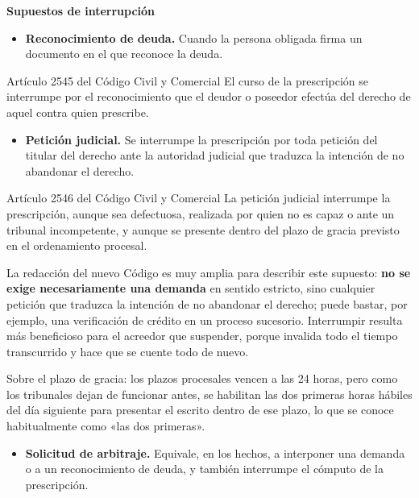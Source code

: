 \documentclass[12pt,oneside]{book}
\begin{document}
\textbf{Supuestos de interrupción}

\begin{itemize}
    \item \textbf{Reconocimiento de deuda.} Cuando la persona obligada firma un documento en el que reconoce la deuda.
\end{itemize}

\begin{articulo}{Artículo 2545 del Código Civil y Comercial}
El curso de la prescripción se interrumpe por el reconocimiento que el deudor o poseedor efectúa del derecho de aquel contra quien prescribe.
\end{articulo}

\begin{itemize}
    \item \textbf{Petición judicial.} Se interrumpe la prescripción por toda petición del titular del derecho ante la autoridad judicial que traduzca la intención de no abandonar el derecho.
\end{itemize}

\begin{articulo}{Artículo 2546 del Código Civil y Comercial}
La petición judicial interrumpe la prescripción, aunque sea defectuosa, realizada por quien no es capaz o ante un tribunal incompetente, y aunque se presente dentro del plazo de gracia previsto en el ordenamiento procesal.
\end{articulo}

La redacción del nuevo Código es muy amplia para describir este supuesto: \textbf{no se exige necesariamente una demanda} en sentido estricto, sino cualquier petición que traduzca la intención de no abandonar el derecho; puede bastar, por ejemplo, una verificación de crédito en un proceso sucesorio. Interrumpir resulta más beneficioso para el acreedor que suspender, porque invalida todo el tiempo transcurrido y hace que se cuente todo de nuevo.

Sobre el plazo de gracia: los plazos procesales vencen a las 24 horas, pero como los tribunales dejan de funcionar antes, se habilitan las dos primeras horas hábiles del día siguiente para presentar el escrito dentro de ese plazo, lo que se conoce habitualmente como «las dos primeras».

\begin{itemize}
    \item \textbf{Solicitud de arbitraje.} Equivale, en los hechos, a interponer una demanda o a un reconocimiento de deuda, y también interrumpe el cómputo de la prescripción.
\end{itemize}
\end{document}
